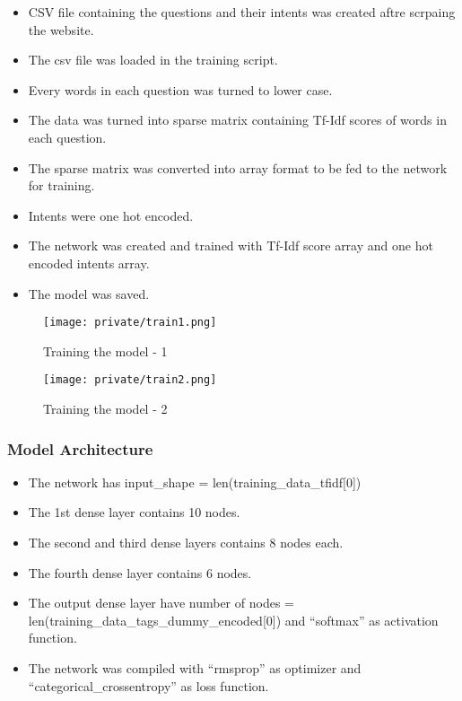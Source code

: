 \documentclass[14pt]{extarticle}
\begin{document}
\begin{itemize}
    \item CSV file containing the questions and their intents was created aftre scrpaing the website.
    \item The csv file was loaded in the training script.
    \item Every words in each question was turned to lower case.
    \item The data was turned into sparse matrix containing Tf-Idf scores of words in each question.
    \item The sparse matrix was converted into array format to be fed to the network for training.
    \item Intents were one hot encoded.
    \item The network was created and trained with Tf-Idf score array and one hot encoded intents array.
    \item The model was saved.
\end{itemize}


\begin{figure}[!htb]
    \begin{center}
        \texttt{[image: private/train1.png]}
    \end{center}
    \caption{Training the model - 1}
\end{figure}


\begin{figure}[!htb]
    \begin{center}
        \texttt{[image: private/train2.png]}
    \end{center}
    \caption{Training the model - 2}
\end{figure}

\subsubsection{Model Architecture}
\begin{itemize}
    \item The network has input\_shape = len(training\_data\_tfidf[0])
    \item The 1st dense layer contains 10 nodes.
    \item The second and third dense layers contains 8 nodes each.
    \item The fourth dense layer contains 6 nodes.
    \item The output dense layer have number of nodes = len(training\_data\_tags\_dummy\_encoded[0]) and “softmax” as activation function.
    \item The network was compiled with “rmsprop” as optimizer and “categorical\_crossentropy” as loss function.
\end{itemize}
\end{document}
